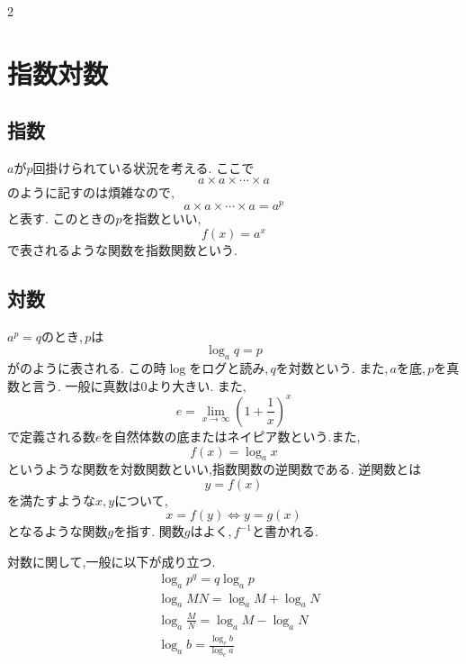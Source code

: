 \documentclass[dvipdfmx,a4paper,11pt,fleqn,openany]{jsbook}
\begin{document}
\begin{multicols*}{2}
    \section{指数対数}
      \subsection{指数}
        $a$が$p$回掛けられている状況を考える.
        ここで
        \[
          a\times a\times\cdots\times a
        \]
        のように記すのは煩雑なので,
        \[
          a\times a\times\cdots\times a=a^p
        \]
        と表す.
        このときの$p$を指数といい,
        \[
          f(x)=a^x
        \]
        で表されるような関数を指数関数という.
      \subsection{対数}
        $a^p=q$のとき,\,$p$は
        \[
          \log_a{q}=p
        \]
        がのように表される.
        この時$\log$をログと読み,\,$q$を対数という.
        また,\,$a$を底,\,$p$を真数と言う.
        一般に真数は0より大きい.
        また,
        \[
          e=\lim_{x \to \infty} \left(1+\frac{1}{x}\right)^x
        \]
        で定義される数$e$を自然体数の底またはネイピア数という.また,
        \[
          f(x)=\log_a x
        \]
        というような関数を対数関数といい,指数関数の逆関数である.
        逆関数とは
        \[
          y=f(x)
        \]
        を満たすような$x,y$について,
        \[
          x=f(y) \iff y=g(x)
        \]
        となるような関数$g$を指す.
        関数$g$はよく,\,$f^{-1}$と書かれる.

        対数に関して,一般に以下が成り立つ.
        \begin{align*}
          &\log_a{p^q}=q\log_a{p}\\
          &\log_a{MN}=\log_a{M}+\log_a{N}\\
          &\log_a{\frac{M}{N}}=\log_a{M}-\log_a{N}\\
          &\log_a{b}=\frac{\log_c{b}}{\log_c{a}}
        \end{align*}
      
\end{multicols*}
\end{document}
